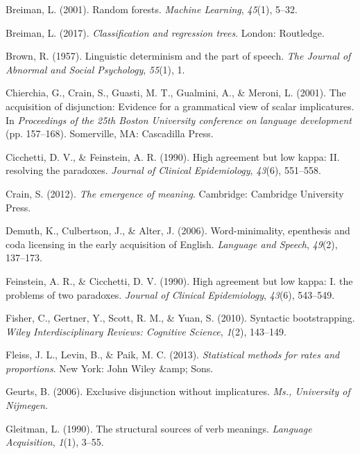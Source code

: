 \documentclass[floatsintext,man]{apa6}
\theoremstyle{definition}
\theoremstyle{definition}
\theoremstyle{definition}
\theoremstyle{remark}
\begin{document}
\hypertarget{refs}{}
\hypertarget{ref-breiman2001random}{}
Breiman, L. (2001). Random forests. \emph{Machine Learning},
\emph{45}(1), 5--32.

\hypertarget{ref-breiman2017classification}{}
Breiman, L. (2017). \emph{Classification and regression trees}. London:
Routledge.

\hypertarget{ref-brown1957linguistic}{}
Brown, R. (1957). Linguistic determinism and the part of speech.
\emph{The Journal of Abnormal and Social Psychology}, \emph{55}(1), 1.

\hypertarget{ref-chierchia2001acquisition}{}
Chierchia, G., Crain, S., Guasti, M. T., Gualmini, A., \& Meroni, L.
(2001). The acquisition of disjunction: Evidence for a grammatical view
of scalar implicatures. In \emph{Proceedings of the 25th Boston
University conference on language development} (pp. 157--168).
Somerville, MA: Cascadilla Press.

\hypertarget{ref-cicchetti1990high}{}
Cicchetti, D. V., \& Feinstein, A. R. (1990). High agreement but low
kappa: II. resolving the paradoxes. \emph{Journal of Clinical
Epidemiology}, \emph{43}(6), 551--558.

\hypertarget{ref-crain2012emergence}{}
Crain, S. (2012). \emph{The emergence of meaning}. Cambridge: Cambridge
University Press.

\hypertarget{ref-demuth2006word}{}
Demuth, K., Culbertson, J., \& Alter, J. (2006). Word-minimality,
epenthesis and coda licensing in the early acquisition of English.
\emph{Language and Speech}, \emph{49}(2), 137--173.

\hypertarget{ref-feinstein1990high}{}
Feinstein, A. R., \& Cicchetti, D. V. (1990). High agreement but low
kappa: I. the problems of two paradoxes. \emph{Journal of Clinical
Epidemiology}, \emph{43}(6), 543--549.

\hypertarget{ref-fisher2010syntactic}{}
Fisher, C., Gertner, Y., Scott, R. M., \& Yuan, S. (2010). Syntactic
bootstrapping. \emph{Wiley Interdisciplinary Reviews: Cognitive
Science}, \emph{1}(2), 143--149.

\hypertarget{ref-fleiss2013statistical}{}
Fleiss, J. L., Levin, B., \& Paik, M. C. (2013). \emph{Statistical
methods for rates and proportions}. New York: John Wiley \&amp; Sons.

\hypertarget{ref-geurts2006exclusive}{}
Geurts, B. (2006). Exclusive disjunction without implicatures.
\emph{Ms., University of Nijmegen}.

\hypertarget{ref-gleitman1990structural}{}
Gleitman, L. (1990). The structural sources of verb meanings.
\emph{Language Acquisition}, \emph{1}(1), 3--55.
\end{document}
